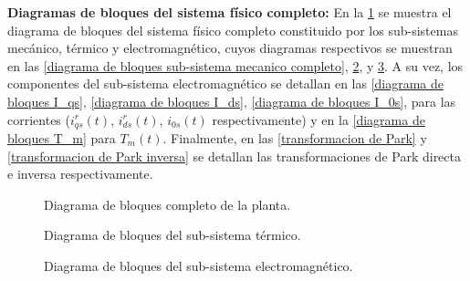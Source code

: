 \documentclass[a4paper, 10pt, onecolumn,journal]{ieeeconf}
\begin{document}
\textbf{Diagramas de bloques del sistema físico completo: } En la \cref{diagrama de bloques del sistema fisico} se muestra
el diagrama de bloques del sistema físico completo constituido por los sub-sistemas mecánico, térmico y electromagnético, cuyos diagramas
respectivos se muestran en las \cref{diagrama de bloques sub-sistema mecanico completo}, \cref{subsistema termico},
y \cref{sub-sistema electromagnetico}. A su vez, los componentes del sub-sistema electromagnético se detallan
en las \cref{diagrama de bloques I_qs}, \cref{diagrama de bloques I_ds}, \cref{diagrama de bloques I_0s}, para las corrientes ($i^r_{qs}(t)$, $i^r_{ds}(t)$, $i_{0s}(t)$ respectivamente) y en la \cref{diagrama de bloques T_m} para $T_m(t)$.
Finalmente, en las \cref{transformacion de Park} y \cref{transformacion de Park inversa} se detallan las transformaciones de Park directa e inversa respectivamente.

\begin{figure}[H]
    \centering
    \begin{adjustbox}{max width=\columnwidth}
    \end{adjustbox}
    \caption{Diagrama de bloques completo de la planta.}
    \label{diagrama de bloques del sistema fisico}
\end{figure}

\begin{figure}[H]
    \centering
    \begin{adjustbox}{scale=0.7,max width=\columnwidth}
    \end{adjustbox}
    \caption{Diagrama de bloques del sub-sistema térmico.}
    \label{subsistema termico}
\end{figure}

\begin{figure}[H]
    \centering
    \begin{adjustbox}{scale=0.7,max width=\columnwidth}
    \end{adjustbox}
    \caption{Diagrama de bloques del sub-sistema electromagnético.}
    \label{sub-sistema electromagnetico}
\end{figure}
\end{document}
